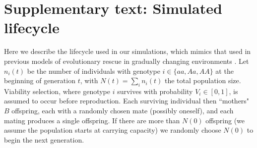 \documentclass[]{article}
\begin{document}


\setcounter{figure}{0}
\renewcommand{\thefigure}{A\arabic{figure}}
\setcounter{table}{0}
\renewcommand{\thetable}{A\arabic{table}}
\setcounter{section}{0}
\renewcommand{\thesection}{A\arabic{section}}
\setcounter{equation}{0}
\renewcommand{\theequation}{A\arabic{equation}}

\section*{Supplementary text: Simulated lifecycle}
\label{sec:lifecycle}

Here we describe the lifecycle used in our simulations, which mimics that used in previous models of evolutionary rescue in gradually changing environments \citep{burger1995evolution}.
Let $n_i(t)$ be the number of individuals with genotype $i\in\{aa,Aa,AA\}$ at the beginning of generation $t$, with $N(t) =  \sum_i{n_i(t)}$ the total population size.
Viability selection, where genotype $i$ survives with probability $V_i\in[0,1]$, is assumed to occur before reproduction.
Each surviving individual then ``mothers" $B$ offspring, each with a randomly chosen mate (possibly oneself), and each mating produces a single offspring. 
If there are more than $N(0)$ offspring (we assume the population starts at carrying capacity) we randomly choose $N(0)$ to begin the next generation.
\end{document}
